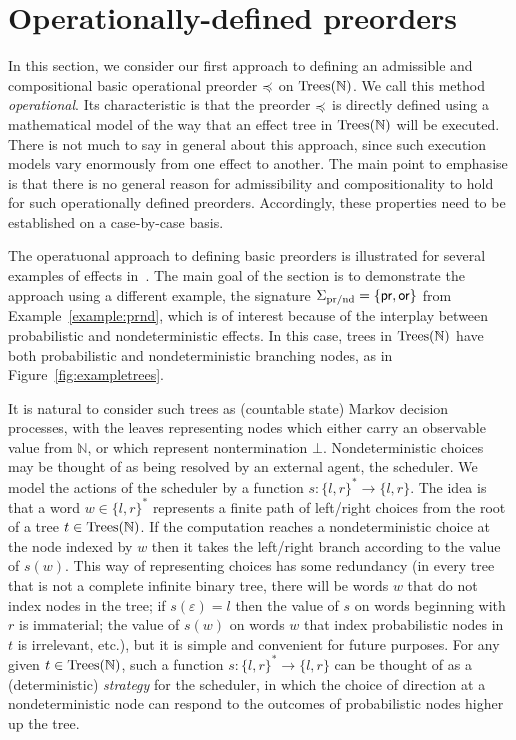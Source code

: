 \section{Operationally-defined preorders}
\label{section:operational}

In this section, we consider our first approach to defining an admissible and compositional basic operational
preorder $\preccurlyeq$ on $\textnormal{Trees}(\mathbb{N})$. We call this method \emph{operational}. Its characteristic is that the preorder
 $\preccurlyeq$ is directly defined using a mathematical model of the way that an effect tree in $\textnormal{Trees}(\mathbb{\mathbb{N}})$ will be executed.
There is not much to say in general about this approach, since such execution models vary enormously from one effect to another.
The main point to emphasise is that there is no general reason for  admissibility and compositionality to hold for such operationally defined preorders. Accordingly, these properties need to be established on a case-by-case basis.

The operatuonal approach to defining basic preorders is illustrated for several examples of effects in~\cite{gom}. 
The main goal of the section is to demonstrate the approach using a different example, the signature
$\Sigma_{\text{pr/nd}} = \{\operatorname{\textsf{pr}},\operatorname{\textsf{or}}\}$ from Example~\ref{example:prnd}, which is of interest because of the 
interplay between probabilistic and nondeterministic effects. 
In this case, trees in $\textnormal{Trees}(\mathbb{N})$ have both probabilistic and nondeterministic branching nodes,
as in Figure~\ref{fig:exampletrees}.


It is natural to consider such trees as (countable state) Markov decision processes, with the leaves representing nodes which either carry an observable value from $\mathbb{N}$, or which represent nontermination $\bot$.
Nondeterministic choices may be thought of as being resolved by an external agent, the scheduler. We model the actions of the scheduler by a 
function $s: \{l,r\}^* \to \{l,r\}$. The idea is that a word $w \in \{l,r\}^*$ represents a finite path of left/right choices from the root of a 
tree $t \in \textnormal{Trees}(\mathbb{N})$. If the computation reaches a nondeterministic choice at the node indexed by 
$w$ then it takes the left/right branch according to the value of $s(w)$. This way of representing choices has some redundancy
(in every tree that is not a complete infinite binary tree, there will be words $w$ that do not index nodes in the tree; if $s(\varepsilon) = l$ then the value of $s$ on words beginning with $r$ is immaterial; the value of $s(w)$ on words $w$ that index 
probabilistic nodes in $t$ is irrelevant, etc.), but it is simple and convenient for future purposes. 
For any given $t \in \textnormal{Trees}(\mathbb{N})$, such a function
$s: \{l,r\}^* \to \{l,r\}$ can be thought of as a (deterministic) \emph{strategy} for the scheduler, in which the choice of direction at a nondeterministic node  
can respond to  the outcomes of probabilistic nodes higher up the tree.


